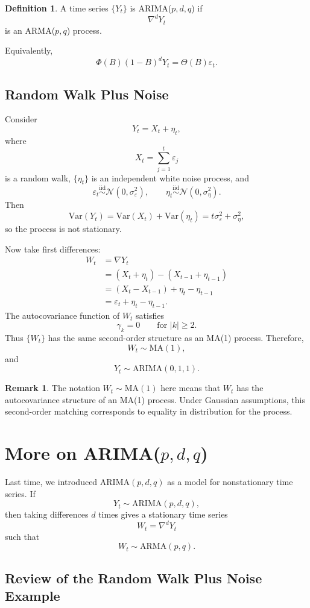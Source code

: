 \documentclass[12pt,oneside]{book}
\numberwithin{equation}{section}
\theoremstyle{definition}
\newtheorem{definition}{Definition}[section]
\newtheorem{remark}{Remark}[section]
\theoremstyle{plain}
\theoremstyle{remark}
\newcommand{\Var}{\mathrm{Var}}
\newcommand{\iid}{\overset{\text{iid}}{\sim}}
\newcommand{\Normal}{\mathcal{N}}
\begin{document}
\begin{definition}
A time series $\{Y_t\}$ is ARIMA($p,d,q$) if
\[
\nabla^dY_t
\]
is an ARMA($p,q$) process.
\end{definition}

Equivalently,
\[
\Phi(B)(1-B)^dY_t=\Theta(B)\varepsilon_t.
\]

\subsection*{Random Walk Plus Noise}

Consider
\[
Y_t=X_t+\eta_t,
\]
where
\[
X_t=\sum_{j=1}^t\varepsilon_j
\]
is a random walk, $\{\eta_t\}$ is an independent white noise process, and
\[
\varepsilon_t\iid \Normal(0,\sigma_\varepsilon^2),
\qquad
\eta_t\iid \Normal(0,\sigma_\eta^2).
\]
Then
\[
\Var(Y_t)=\Var(X_t)+\Var(\eta_t)
=
t\sigma_\varepsilon^2+\sigma_\eta^2,
\]
so the process is not stationary.

Now take first differences:
\begin{align*}
W_t
&=
\nabla Y_t \\
&=
(X_t+\eta_t)-(X_{t-1}+\eta_{t-1}) \\
&=
(X_t-X_{t-1})+\eta_t-\eta_{t-1} \\
&=
\varepsilon_t+\eta_t-\eta_{t-1}.
\end{align*}
The autocovariance function of $W_t$ satisfies
\[
\gamma_k=0
\qquad
\text{for } |k|\geq 2.
\]
Thus $\{W_t\}$ has the same second-order structure as an MA(1) process. Therefore,
\[
W_t\sim \mathrm{MA}(1),
\]
and
\[
Y_t\sim \mathrm{ARIMA}(0,1,1).
\]

\begin{remark}
The notation $W_t\sim \mathrm{MA}(1)$ here means that $W_t$ has the autocovariance structure of an MA(1) process. Under Gaussian assumptions, this second-order matching corresponds to equality in distribution for the process.
\end{remark}

\section{More on ARIMA($p,d,q$)}

Last time, we introduced ARIMA$(p,d,q)$ as a model for nonstationary time series. If
\[
Y_t\sim \mathrm{ARIMA}(p,d,q),
\]
then taking differences $d$ times gives a stationary time series
\[
W_t=\nabla^dY_t
\]
such that
\[
W_t\sim \mathrm{ARMA}(p,q).
\]

\subsection*{Review of the Random Walk Plus Noise Example}
\end{document}
